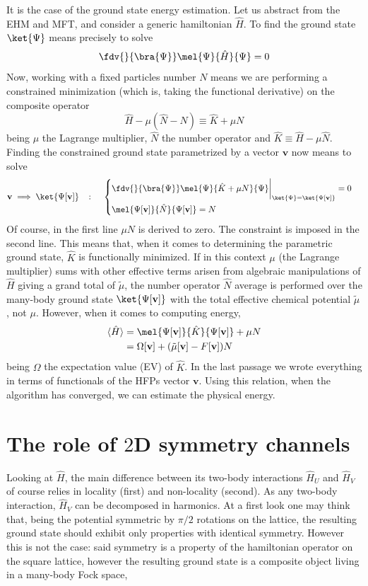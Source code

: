 It is the case of the ground state energy estimation. Let us abstract from the EHM and MFT, and consider a generic hamiltonian $\hat H$. To find the ground state $\ket{\Psi}$ means precisely to solve
\[
	\fdv{}{\bra{\Psi}} \mel{\Psi}{\hat H}{\Psi} = 0
\]
Now, working with a fixed particles number $N$ means we are performing a constrained minimization (which is, taking the functional derivative) on the composite operator
\[
	\hat H - \mu (\hat N - N) \equiv \hat K + \mu N
\]
being $\mu$ the Lagrange multiplier, $\hat N$ the number operator and $\hat K \equiv \hat H - \mu \hat N$. Finding the constrained ground state parametrized by a vector $\mathbf{v}$ now means to solve
\[
	\mathbf{v} \implies \ket{\Psi [\mathbf{v}]}
	\quad\colon\quad
	\begin{cases}
		\displaystyle
		\fdv{}{\bra{\Psi}} \mel{\Psi}{\hat K + \mu N}{\Psi} \bigg|_{\ket{\Psi}=\ket{\Psi [\mathbf{v}]}} = 0 \\[1em]
		\mel{\Psi [\mathbf{v}]}{\hat N}{\Psi [\mathbf{v}]} = N
	\end{cases}
\]
Of course, in the first line $\mu N$ is derived to zero. The constraint is imposed in the second line. This means that, when it comes to determining the parametric ground state, $\hat K$ is functionally minimized. If in this context $\mu$ (the Lagrange multiplier) sums with other effective terms arisen from algebraic manipulations of $\hat H$ giving a grand total of $\tilde{\mu}$, the number operator $\hat N$ average is performed over the many-body ground state $\ket{\Psi [\mathbf{v}]}$ with the total effective chemical potential $\tilde{\mu}$, not $\mu$. However, when it comes to computing energy,
\[
\begin{aligned}
	\langle \hat H \rangle &= \mel{\Psi[\mathbf{v}]}{\hat K}{\Psi[\mathbf{v}]} + \mu N \\
	&= \Omega[\mathbf{v}] + (\tilde{\mu}[\mathbf{v}]-F[\mathbf{v}]) N
\end{aligned}
\]
being $\Omega$ the expectation value (EV) of $\hat K$. In the last passage we wrote everything in terms of functionals of the HFPs vector $\mathbf{v}$. Using this relation, when the algorithm has converged, we can estimate the physical energy.

\section{The role of $2$D symmetry channels}

Looking at $\hat H$, the main difference between its two-body interactions $\hat H_U$ and $\hat H_V$ of course relies in locality (first) and non-locality (second). As any two-body interaction, $\hat H_V$ can be decomposed in harmonics. At a first look one may think that, being the potential symmetric by $\pi/2$ rotations on the lattice, the resulting ground state should exhibit only properties with identical symmetry. However this is not the case: said symmetry is a property of the hamiltonian operator on the square lattice, however the resulting ground state is a composite object living in a many-body Fock space, \todo


